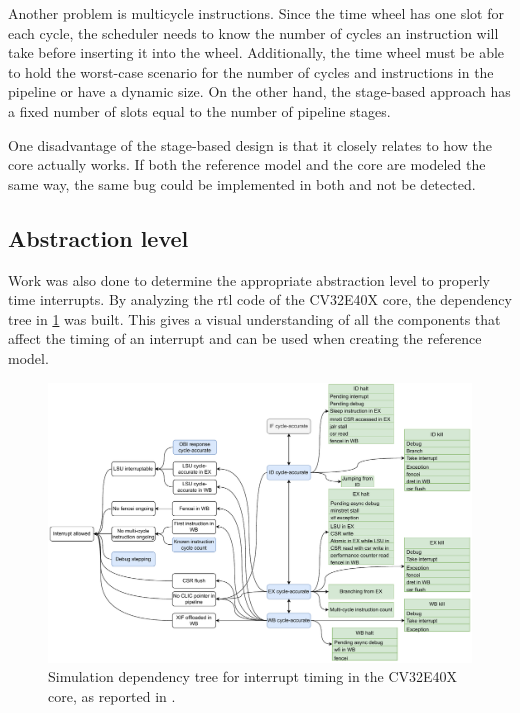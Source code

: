 Another problem is multicycle instructions. Since the time wheel has one slot for each cycle, the scheduler needs to know the number of cycles an instruction will take before inserting it into the wheel. Additionally, the time wheel must be able to hold the worst-case scenario for the number of cycles and instructions in the pipeline or have a dynamic size. On the other hand, the stage-based approach has a fixed number of slots equal to the number of pipeline stages. 

One disadvantage of the stage-based design is that it closely relates to how the core actually works. If both the reference model and the core are modeled the same way, the same bug could be implemented in both and not be detected.


\subsection{Abstraction level}

Work was also done to determine the appropriate abstraction level to properly time interrupts. By analyzing the \acrshort{rtl} code of the CV32E40X core, the dependency tree in \cref{fig:dependency-tree-cv32x} was built. This gives a visual understanding of all the components that affect the timing of an interrupt and can be used when creating the reference model.

\begin{figure}
    \centering
    \includegraphics[width=1.0\linewidth]{figures/dependency_tree_full.pdf}
    \caption{Simulation dependency tree for interrupt timing in the CV32E40X core, as reported in \cite{torjenygaardeikenesDesigningRISCVReference2023}.}
    \label{fig:dependency-tree-cv32x}
\end{figure}

